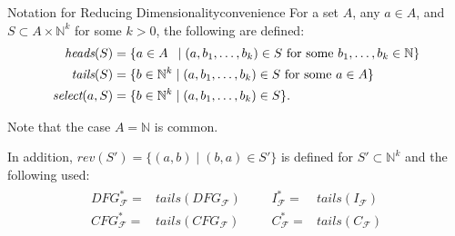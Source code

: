 \begin{definition}{Notation for Reducing Dimensionality}{convenience}
    For a set $A$, any $a\in A$, and $S\subset A\times\mathbb N^k$ for some
    $k>0$, the following are defined:
    \begin{align*}
        \textit{heads}(S)={}&\{a\in A\hspace{1.8mm}\mid(a,b_1,\dots,b_k)\in S\text{ for some }b_1,\dots,b_k\in\mathbb N\}\\
        \textit{tails}(S)={}&\{b\in\mathbb N^k\mid(a,b_1,\dots,b_k)\in S\text{ for some }a\in A\}\\
        \textit{select}(a,S)={}&\{b\in\mathbb N^k\mid(a,b_1,\dots,b_k)\in S\}.
    \end{align*}

    Note that the case $A=\mathbb N$ is common.

    In addition, $\textit{rev}(S')=\{(a,b)\mid(b,a)\in S'\}$ is
    defined for $S'\subset\mathbb N^k$ and the following used:
    \begin{align*}
        \begin{aligned}
        DFG_\mathcal F^*={}&\textit{tails}(DFG_\mathcal F)\\
        CFG_\mathcal F^*={}&\textit{tails}(CFG_\mathcal F)
        \end{aligned}&&
        \begin{aligned}
        I_\mathcal F^*={}&\textit{tails}(I_\mathcal F)\\
        C_\mathcal F^*={}&\textit{tails}(C_\mathcal F)
        \end{aligned}
    \end{align*}
\end{definition}
